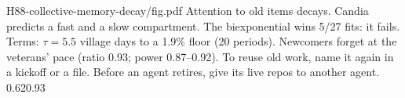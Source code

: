 {H88-collective-memory-decay/fig.pdf}
{Attention to old items decays. Candia predicts a fast and a slow compartment.}
{The biexponential wins 5/27 fits: it fails. Terms: $\tau=5.5$ village days to a 1.9\% floor (20 periods). Newcomers forget at the veterans' pace (ratio 0.93; power 0.87--0.92).}
{To reuse old work, name it again in a kickoff or a file. Before an agent retires, give its live repos to another agent.}
{0.62}{0.93}
